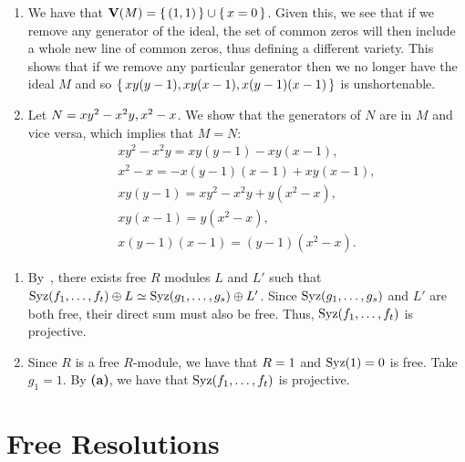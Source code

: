 \documentclass[letterpaper, 11pt, oneside]{book}
\begin{document}
\begin{sol}\label{ex:UAG_5.4.4}
  \begin{enumerate}
    \item We have that $\operatorname{\mathbf{V}}(M) = \set{(1, 1)} \cup \set{x = 0}$.
          Given this, we see that if we remove any generator of the ideal, the set of common zeros will then include a whole new line of common zeros, thus defining a different variety.
          This shows that if we remove any particular generator then we no longer have the ideal $M$ and so $\set{xy(y - 1), xy(x - 1), x(y - 1)(x - 1)}$ is unshortenable.
    \item Let $N = \ideal{xy^{2} - x^{2}y, x^{2} - x}$.
          We show that the generators of $N$ are in $M$ and vice versa, which implies that $M = N$:
          \begin{gather*}
            xy^{2} - x^{2}y = xy(y - 1) - xy(x - 1), \\
            x^{2} - x = -x(y - 1)(x -1) + xy(x - 1), \\
            xy(y - 1) = xy^{2} - x^{2}y + y(x^{2} - x), \\
            xy(x - 1) = y(x^{2} - x), \\
            x(y - 1)(x - 1) = (y - 1)(x^{2} -x).
          \end{gather*}
  \end{enumerate}
\end{sol}

\begin{sol}\label{ex:UAG_5.4.6}
  \begin{enumerate}
    \item By~\cite[\S 4.3, Proposition 3.10]{book:UAG}, there exists free $R$ modules $L$ and $L'$ such that $\operatorname{Syz}(f_{1}, \ldots, f_{t}) \oplus L \simeq \operatorname{Syz}(g_{1}, \ldots, g_{s}) \oplus L'$.
          Since $\operatorname{Syz}(g_{1}, \ldots, g_{s})$ and $L'$ are both free, their direct sum must also be free.
          Thus, $\operatorname{Syz}(f_{1}, \ldots, f_{t})$ is projective.
    \item Since $R$ is a free $R$-module, we have that $R = \ideal{1}$ and $\Syz(1) = \ideal{0}$ is free.
          Take $g_{1} = 1$.
          By \textbf{(a)}, we have that $\operatorname{Syz}(f_{1}, \ldots, f_{t})$ is projective.
  \end{enumerate}
\end{sol}

\chapter{Free Resolutions}
\end{document}
